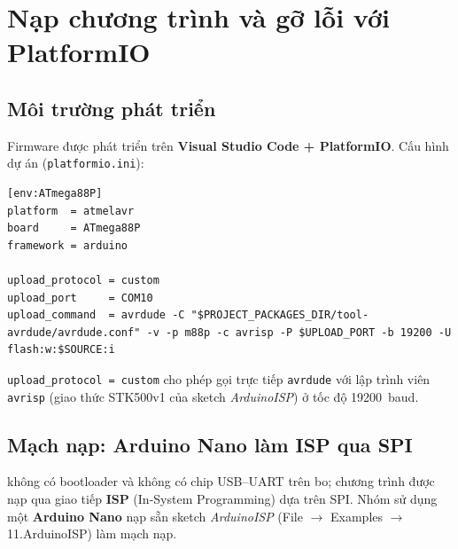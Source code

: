 \section{Nạp chương trình và gỡ lỗi với PlatformIO}

\subsection{Môi trường phát triển}
Firmware được phát triển trên \textbf{Visual Studio Code + PlatformIO}. Cấu hình dự án (\texttt{platformio.ini}):
\begin{lstlisting}[language={},caption={Tệp cấu hình platformio.ini},label={lst:pio}]
[env:ATmega88P]
platform  = atmelavr
board     = ATmega88P
framework = arduino

upload_protocol = custom
upload_port     = COM10
upload_command  = avrdude -C "$PROJECT_PACKAGES_DIR/tool-avrdude/avrdude.conf" -v -p m88p -c avrisp -P $UPLOAD_PORT -b 19200 -U flash:w:$SOURCE:i
\end{lstlisting}
\texttt{upload\_protocol = custom} cho phép gọi trực tiếp \texttt{avrdude} với lập trình viên \texttt{avrisp} (giao thức STK500v1 của sketch \emph{ArduinoISP}) ở tốc độ \SI{19200}{baud}.

\subsection{Mạch nạp: Arduino Nano làm ISP qua SPI}
\proj{} không có bootloader và không có chip USB--UART trên bo; chương trình được nạp qua giao tiếp \textbf{ISP} (In-System Programming) dựa trên SPI. Nhóm sử dụng một \textbf{Arduino Nano} nạp sẵn sketch \emph{ArduinoISP} (File $\to$ Examples $\to$ 11.ArduinoISP) làm mạch nạp.

